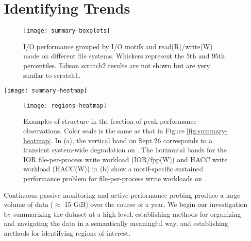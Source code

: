 \section{Identifying Trends}  \label{sec:features}

\begin{figure}
    \centering
    \texttt{[image: summary-boxplots]}
    \vspace{-.15in}
    \caption{I/O performance grouped by I/O motifs and read(R)/write(W) mode on different file systems.  Whiskers represent the 5th and 95th percentiles.  Edison scratch2 results are not shown but are very similar to scratch1.}
    \label{fig:summary-boxplots}
	\vspace{-.15in}
\end{figure}

\begin{figure*}
    \centering
    \texttt{[image: summary-heatmap]}
    \vspace{-.2in}
    \caption{Performance of daily probes normalized to the peak observed performance for each probe type (I/O motif and read/write mode combination) on the specified system.  The y-axis labels show combinations of system, I/O motif, and mode (Read/Write).  Grey represents days on which no observations were made.  The two regions highlighted in green boxes are expanded upon in Figure \ref{fig:regions-heatmap}.}
    \label{fig:summary-heatmap}
\end{figure*}

\begin{figure}
    \centering
    \texttt{[image: regions-heatmap]}
    \vspace{-.2in}
    \caption{Examples of structure in the fraction of peak performance observations.  Color scale is the same as that in Figure \ref{fig:summary-heatmap}.  In (a), the vertical band on Sept 26 corresponds to a transient system-wide degradation on \mira.  The horizontal bands for the IOR file-per-process write workload (IOR/fpp(W)) and HACC write workload (HACC(W)) in (b) show a motif-specific sustained performance problem for file-per-process write workloads on \cori.}
    \label{fig:regions-heatmap}
\end{figure}

Continuous passive monitoring and active performance probing produce
a large volume of data ($\approx$ 15 GiB) over the course of a year.  We begin our
investigation by summarizing the dataset at a high level, establishing
methods for organizing and navigating the data in a semantically
meaningful way, and establishing methods for identifying regions of
interest.

